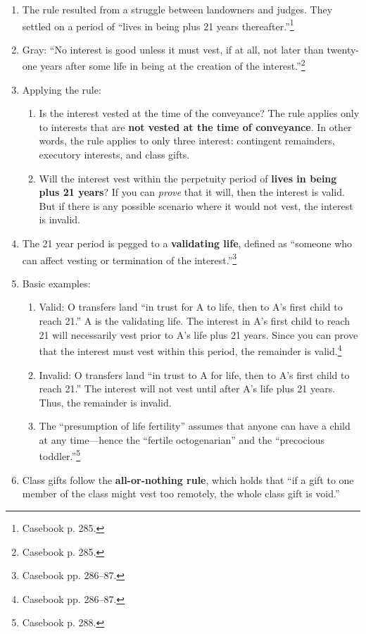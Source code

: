 \begin{enumerate}
    \item The rule resulted from a struggle between landowners and judges. 
    They settled on a period of ``lives in being plus 21 years 
    thereafter.''\footnote{Casebook p. 285.}
    \item Gray: ``No interest is good unless it must vest, if at all, not 
    later than twenty-one years after some life in being at the creation of 
    the interest.''\footnote{Casebook p. 285.}
    \item Applying the rule:
    \begin{enumerate}
        \item Is the interest vested at the time of the conveyance? The rule 
        applies only to interests that are \textbf{not vested at the time of 
        conveyance}. In other words, the rule applies to only three interest: 
        contingent remainders, executory interests, and class gifts.
        \item Will the interest vest within the perpetuity period of 
        \textbf{lives in being plus 21 years}? If you can \emph{prove} that it 
        will, then the interest is valid. But if there is any possible 
        scenario where it would not vest, the interest is invalid.
    \end{enumerate}
    \item The 21 year period is pegged to a \textbf{validating life}, defined 
    as ``someone who can affect vesting or termination of the 
    interest.''\footnote{Casebook pp. 286--87.}
    \item Basic examples:
    \begin{enumerate}
        \item Valid: O transfers land ``in trust for A to life, then to A's 
        first child to reach 21.'' A is the validating life. The interest in 
        A's first child to reach 21 will necessarily vest prior to A's life 
        plus 21 years. Since you can prove that the interest must vest within 
        this period, the remainder is valid.\footnote{Casebook pp. 286--87.}
        \item Invalid: O transfers land ``in trust to A for life, then to A's 
        first child to reach 21.'' The interest will not vest until after A's 
        life plus 21 years. Thus, the remainder is invalid.
        \item The ``presumption of life fertility'' assumes that anyone can 
        have a child at any time---hence the ``fertile octogenarian'' and the 
        ``precocious toddler.''\footnote{Casebook p. 288.}
    \end{enumerate}
    \item Class gifts follow the \textbf{all-or-nothing rule}, which holds 
    that ``if a gift to one member of the class might vest too remotely, the 
    whole class gift is void.'' %
\end{enumerate}

